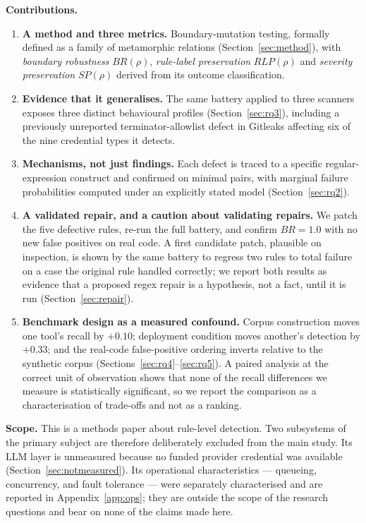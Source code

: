 \documentclass[journal]{IEEEtran}
\begin{document}
\medskip\noindent\textbf{Contributions.}
\begin{enumerate}
\item \textbf{A method and three metrics.} Boundary-mutation testing, formally defined as a family of metamorphic relations (Section~\ref{sec:method}), with \emph{boundary robustness} $BR(\rho)$, \emph{rule-label preservation} $RLP(\rho)$ and \emph{severity preservation} $SP(\rho)$ derived from its outcome classification.
\item \textbf{Evidence that it generalises.} The same battery applied to three scanners exposes three distinct behavioural profiles (Section~\ref{sec:rq3}), including a previously unreported terminator-allowlist defect in Gitleaks affecting six of the nine credential types it detects.
\item \textbf{Mechanisms, not just findings.} Each defect is traced to a specific regular-expression construct and confirmed on minimal pairs, with marginal failure probabilities computed under an explicitly stated model (Section~\ref{sec:rq2}).
\item \textbf{A validated repair, and a caution about validating repairs.} We patch the five defective rules, re-run the full battery, and confirm $BR=1.0$ with no new false positives on real code. A first candidate patch, plausible on inspection, is shown by the same battery to regress two rules to total failure on a case the original rule handled correctly; we report both results as evidence that a proposed regex repair is a hypothesis, not a fact, until it is run (Section~\ref{sec:repair}).
\item \textbf{Benchmark design as a measured confound.} Corpus construction moves one tool's recall by $+0.10$; deployment condition moves another's detection by $+0.33$; and the real-code false-positive ordering inverts relative to the synthetic corpus (Sections~\ref{sec:rq4}--\ref{sec:rq5}). A paired analysis at the correct unit of observation shows that none of the recall differences we measure is statistically significant, so we report the comparison as a characterisation of trade-offs and not as a ranking.
\end{enumerate}

\medskip\noindent\textbf{Scope.} This is a methods paper about rule-level detection. Two subsystems of the primary subject are therefore deliberately excluded from the main study. Its LLM layer is unmeasured because no funded provider credential was available (Section~\ref{sec:notmeasured}). Its operational characteristics --- queueing, concurrency, and fault tolerance --- were separately characterised and are reported in Appendix~\ref{app:ops}; they are outside the scope of the research questions and bear on none of the claims made here.
\end{document}
